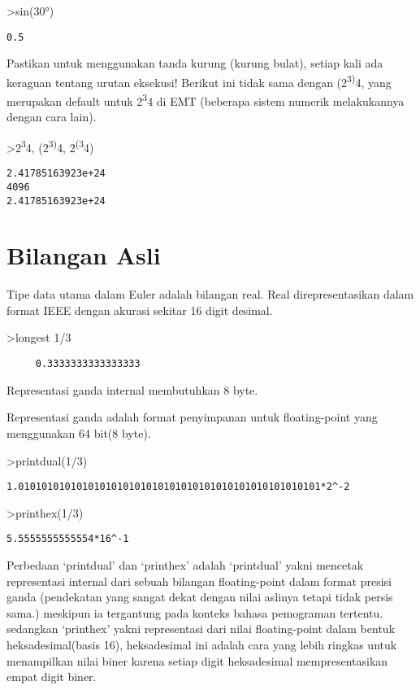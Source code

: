 \documentclass[
]{book}
\begin{document}
\textgreater sin(30°)

\begin{verbatim}
0.5
\end{verbatim}

Pastikan untuk menggunakan tanda kurung (kurung bulat), setiap kali ada keraguan tentang urutan eksekusi! Berikut ini tidak sama dengan (2\textsuperscript{3)}4, yang merupakan default untuk 2\textsuperscript{3}4 di EMT (beberapa sistem numerik melakukannya dengan cara lain).

\textgreater2\textsuperscript{3}4, (2\textsuperscript{3)}4, 2\textsuperscript{(3}4)

\begin{verbatim}
2.41785163923e+24
4096
2.41785163923e+24
\end{verbatim}

\chapter{Bilangan Asli}\label{bilangan-asli}

Tipe data utama dalam Euler adalah bilangan real. Real direpresentasikan dalam format IEEE dengan akurasi sekitar 16 digit desimal.

\textgreater longest 1/3

\begin{verbatim}
     0.3333333333333333 
\end{verbatim}

Representasi ganda internal membutuhkan 8 byte.

Representasi ganda adalah format penyimpanan untuk floating-point yang menggunakan 64 bit(8 byte).

\textgreater printdual(1/3)

\begin{verbatim}
1.0101010101010101010101010101010101010101010101010101*2^-2
\end{verbatim}

\textgreater printhex(1/3)

\begin{verbatim}
5.5555555555554*16^-1
\end{verbatim}

Perbedaan `printdual' dan `printhex' adalah `printdual' yakni mencetak representasi internal dari sebuah bilangan floating-point dalam format presisi ganda (pendekatan yang sangat dekat dengan nilai aslinya tetapi tidak persis sama.) meskipun ia tergantung pada konteks bahasa pemograman tertentu. sedangkan `printhex' yakni representasi dari nilai floating-point dalam bentuk heksadesimal(basis 16), heksadesimal ini adalah cara yang lebih ringkas untuk menampilkan nilai biner karena setiap digit heksadesimal mempresentasikan empat digit biner.
\end{document}
